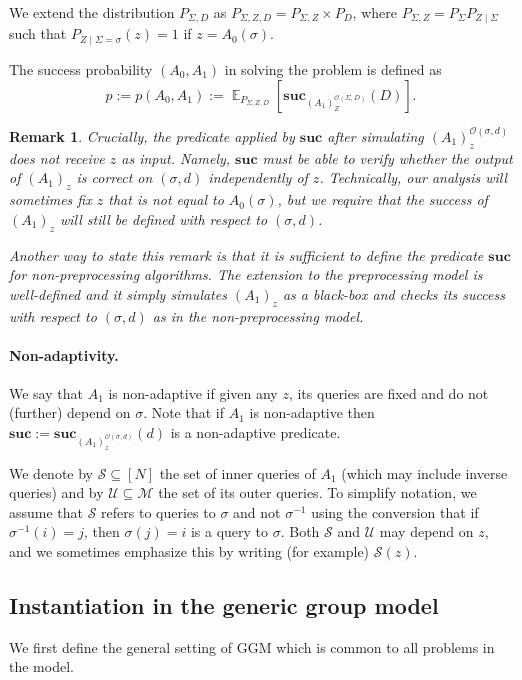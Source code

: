 \documentclass[11pt]{article}
\newtheorem{remark}[theorem]{Remark}
\DeclareMathOperator*{\E}{\mathbb{E}}
\newcommand{\secv}{{d}}
\newcommand{\SECV}{{D}}
\newcommand{\SUC}{\boldsymbol{suc}}
\begin{document}
We extend the distribution $P_{\Sigma,\SECV}$ as $P_{\Sigma,Z,\SECV} = P_{\Sigma,Z} \times P_\SECV$,
where 
$P_{\Sigma,Z} = P_{\Sigma} P_{Z \mid \Sigma}$ such that $P_{Z \mid \Sigma = \sigma}(z) = 1$ if 
$z = A_0(\sigma)$.

The success probability $(A_0,A_1)$ in solving the problem is defined as
$$p := p(A_0,A_1) := \E_{P_{\Sigma,Z,\SECV}}[\SUC_{(A_1)_{Z}^{\mathcal{O}(\Sigma,\SECV)}}(\SECV)].$$

\begin{remark}
\label{remark:z}
Crucially, the predicate applied by $\SUC$ after simulating $(A_1)_z^{\mathcal{O}(\sigma,\secv)}$ does not receive $z$ as input.
Namely, $\SUC$ must be able to verify whether the output of $(A_1)_z$ is correct on $(\sigma,\secv)$ \emph{independently} of $z$. Technically, our analysis will sometimes fix $z$ that is not equal to $A_0(\sigma)$, but we require that the success of $(A_1)_z$ will still be defined with respect to $(\sigma,\secv)$.

Another way to state this remark is that it is sufficient to define the predicate $\SUC$ for non-preprocessing algorithms. The extension to the preprocessing model is well-defined and it simply simulates $(A_1)_z$ as a black-box and checks its success with respect to $(\sigma,\secv)$ as in the non-preprocessing model.
\end{remark}

\paragraph{Non-adaptivity.}
We say that $A_1$ is non-adaptive if given any $z$, its queries are fixed and do not (further) depend on $\sigma$. 
Note that if $A_1$ is non-adaptive then
$\SUC := \SUC_{(A_1)_z^{\mathcal{O}(\sigma,\secv)}}(\secv)$ is a non-adaptive predicate. 

We denote by $\mathcal{S} \subseteq [N]$ the set of inner queries of $A_1$ (which may include inverse queries) and by 
$\mathcal{U} \subseteq \mathcal{M}$ the set of its outer queries.
To simplify notation, we assume that $\mathcal{S}$ refers to queries to $\sigma$ and not $\sigma^{-1}$ using the conversion that if $\sigma^{-1}(i) = j$, then $\sigma(j) = i$ is a query to $\sigma$.
Both $\mathcal{S}$ and $\mathcal{U}$ may depend on $z$,
and we sometimes emphasize this by writing (for example) $\mathcal{S}(z)$. 

\subsection{Instantiation in the 
 generic group model}
\label{sec:inst GGM}
We first define the general setting of GGM which is common to all problems in the model.
\end{document}
